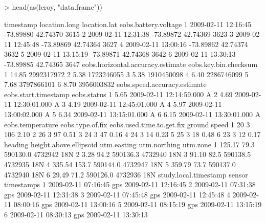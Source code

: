 \documentclass[article,nojss]{jss}
\begin{document}
\begin{Schunk}
\begin{Sinput}
> head(as(leroy, "data.frame"))
\end{Sinput}
\begin{Soutput}
            timestamp location.long location.lat eobs.battery.voltage
1 2009-02-11 12:16:45     -73.89880     42.74370                 3615
2 2009-02-11 12:31:38     -73.89872     42.74369                 3623
3 2009-02-11 12:45:48     -73.89869     42.74364                 3627
4 2009-02-11 13:00:16     -73.89862     42.74374                 3632
5 2009-02-11 13:15:19     -73.89871     42.74368                 3642
6 2009-02-11 13:30:13     -73.89885     42.74365                 3647
  eobs.horizontal.accuracy.estimate eobs.key.bin.checksum
1                             14.85            2992317972
2                              5.38            1723246055
3                              5.38            1910450098
4                              6.40            2286746099
5                              7.68            3797866101
6                              8.70            3956003832
  eobs.speed.accuracy.estimate    eobs.start.timestamp eobs.status
1                         5.65 2009-02-11 12:14:59.000           A
2                         4.69 2009-02-11 12:30:01.000           A
3                         4.19 2009-02-11 12:45:01.000           A
4                         5.97 2009-02-11 13:00:02.000           A
5                         6.34 2009-02-11 13:15:01.000           A
6                         6.15 2009-02-11 13:30:01.000           A
  eobs.temperature eobs.type.of.fix eobs.used.time.to.get.fix ground.speed
1               20                3                       106         2.10
2               26                3                        97         0.51
3               24                3                        47         0.16
4               24                3                        14         0.23
5               25                3                        18         0.48
6               23                3                        12         0.17
  heading height.above.ellipsoid utm.easting utm.northing utm.zone
1  125.17                   79.3    590130.0      4732942      18N
2    3.28                   94.2    590136.3      4732940      18N
3   91.10                   82.5    590138.5      4732935      18N
4  335.54                  153.7    590144.0      4732947      18N
5  359.79                   73.7    590137.0      4732940      18N
6   29.49                   71.2    590126.0      4732936      18N
  study.local.timestamp sensor          timestamps
1   2009-02-11 07:16:45    gps 2009-02-11 12:16:45
2   2009-02-11 07:31:38    gps 2009-02-11 12:31:38
3   2009-02-11 07:45:48    gps 2009-02-11 12:45:48
4   2009-02-11 08:00:16    gps 2009-02-11 13:00:16
5   2009-02-11 08:15:19    gps 2009-02-11 13:15:19
6   2009-02-11 08:30:13    gps 2009-02-11 13:30:13
\end{Soutput}
\end{Schunk}
\end{document}
